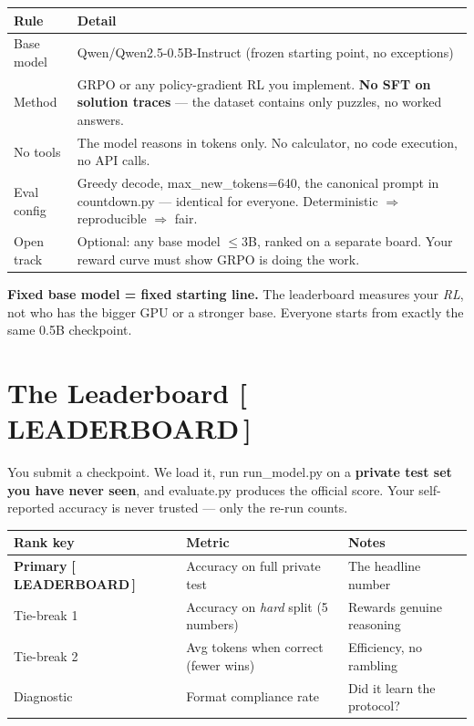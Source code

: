\documentclass[11pt]{article}
\newcommand{\lbtag}{{\sans\footnotesize\color{plum}\textbf{[\,LEADERBOARD\,]}}}
\newcommand{\codesm}[1]{{\ttfamily\footnotesize #1}}
\begin{document}
\begin{center}
\renewcommand{\arraystretch}{1.32}
\begin{tabular}{l p{10.5cm}}
\toprule
\textbf{Rule} & \textbf{Detail} \\
\midrule
Base model & \codesm{Qwen/Qwen2.5-0.5B-Instruct} (frozen starting point, no exceptions) \\
Method & GRPO or any policy-gradient RL you implement. \textbf{No SFT on solution traces}
         --- the dataset contains only puzzles, no worked answers. \\
No tools & The model reasons in tokens only. No calculator, no code execution, no API calls. \\
Eval config & Greedy decode, \codesm{max\_new\_tokens=640}, the canonical prompt in \codesm{countdown.py} ---
             identical for everyone. Deterministic $\Rightarrow$ reproducible $\Rightarrow$ fair. \\
Open track & Optional: any base model $\leq 3$B, ranked on a separate board.
             Your reward curve must show GRPO is doing the work. \\
\bottomrule
\end{tabular}
\end{center}

\begin{warn}
\textbf{Fixed base model = fixed starting line.}
The leaderboard measures your \emph{RL}, not who has the bigger GPU or a stronger base.
Everyone starts from exactly the same 0.5B checkpoint.
\end{warn}

\section{The Leaderboard \lbtag}

You submit a checkpoint. We load it, run \codesm{run\_model.py} on a \textbf{private test set you have never seen}, and \codesm{evaluate.py} produces the official score. Your self-reported accuracy is never trusted --- only the re-run counts.

\begin{center}
\renewcommand{\arraystretch}{1.32}
\begin{tabular}{l l p{7.5cm}}
\toprule
\textbf{Rank key} & \textbf{Metric} & \textbf{Notes} \\
\midrule
\textbf{Primary} \lbtag & Accuracy on full private test & The headline number \\
Tie-break 1 & Accuracy on \textit{hard} split (5 numbers) & Rewards genuine reasoning \\
Tie-break 2 & Avg tokens when correct (fewer wins) & Efficiency, no rambling \\
Diagnostic & Format compliance rate & Did it learn the protocol? \\
\bottomrule
\end{tabular}
\end{center}
\end{document}
